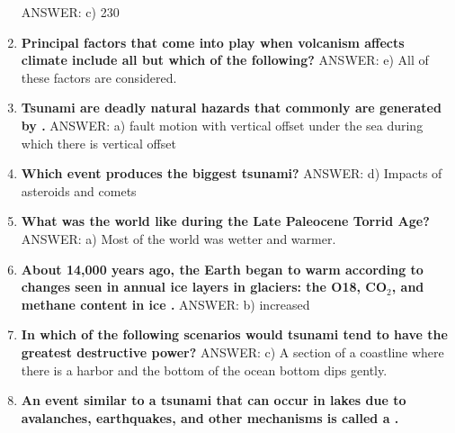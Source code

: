 \documentclass[10pt]{article}
\newcommand{\Rivpt}{\rule{.1pt}{1pt}}
\begin{document}
\begin{enumerate}
{\begin{samepage}
ANSWER: c)	230
\end{samepage}
}
\item {
\setlength{\itemsep}{0cm}
\setlength{\parskip}{.2cm}
\begin{samepage}
\textbf{
Principal factors that come into play when volcanism affects climate include all but which of the following?
}
ANSWER: e) All of these factors are considered.
\end{samepage}
}
\item {
\setlength{\itemsep}{0cm}
\setlength{\parskip}{.2cm}
\begin{samepage}
\textbf{
Tsunami are deadly natural hazards that commonly are generated by \makebox[1cm]{\Rivpt\hrulefill\Rivpt}.
}
ANSWER: a)	fault motion with vertical offset under the sea during which there is vertical offset
\end{samepage}
}
\item {
\setlength{\itemsep}{0cm}
\setlength{\parskip}{.2cm}
\begin{samepage}
\textbf{
Which event produces the biggest tsunami?
}
ANSWER: d)	Impacts of asteroids and comets
\end{samepage}
}
\item {
\setlength{\itemsep}{0cm}
\setlength{\parskip}{.2cm}
\begin{samepage}
\textbf{
What was the world like during the Late Paleocene Torrid Age? 
}
ANSWER: a) Most of the world was wetter and warmer.
\end{samepage}
}
\item {
\setlength{\itemsep}{0cm}
\setlength{\parskip}{.2cm}
\begin{samepage}
\textbf{
About 14,000 years ago, the Earth began to warm according to changes seen in annual ice layers in glaciers: the O18, CO\ensuremath{_2}, and methane content in ice \makebox[1cm]{\Rivpt\hrulefill\Rivpt}.
}
ANSWER: b) increased
\end{samepage}
}
\item {
\setlength{\itemsep}{0cm}
\setlength{\parskip}{.2cm}
\begin{samepage}
\textbf{
In which of the following scenarios would tsunami tend to have the greatest destructive power?
}
ANSWER: c)	A section of a coastline where there is a harbor and the bottom of the ocean bottom dips gently.
\end{samepage}
}
\item {
\setlength{\itemsep}{0cm}
\setlength{\parskip}{.2cm}
\begin{samepage}
\textbf{
An event similar to a tsunami that can occur in lakes due to avalanches, earthquakes, and other mechanisms is called a \makebox[1cm]{\Rivpt\hrulefill\Rivpt}.
}
\end{samepage}}
\end{enumerate}
\end{document}
